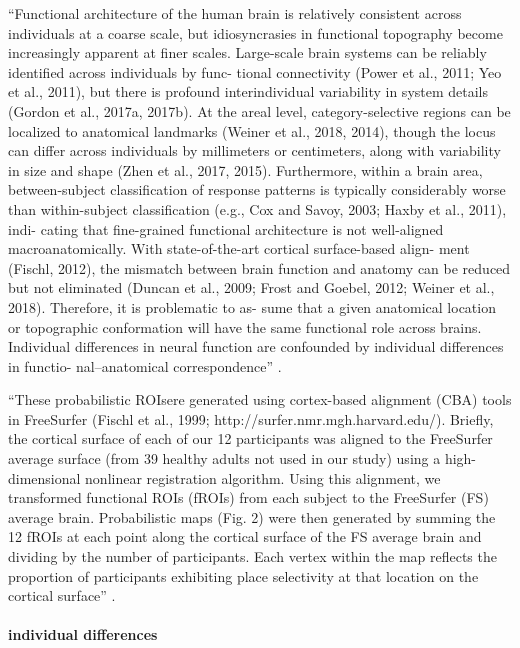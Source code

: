 ``Functional architecture of the human brain is relatively consistent across
individuals at a coarse scale, but idiosyncrasies in functional topography
become increasingly apparent at ﬁner scales. Large-scale brain systems can be
reliably identiﬁed across individuals by func- tional connectivity (Power et
al., 2011; Yeo et al., 2011), but there is profound interindividual variability
in system details (Gordon et al., 2017a, 2017b). At the areal level,
category-selective regions can be localized to anatomical landmarks (Weiner et
al., 2018, 2014), though the locus can differ across individuals by millimeters
or centimeters, along with variability in size and shape (Zhen et al., 2017,
2015). Furthermore, within a brain area, between-subject classiﬁcation of
response patterns is typically considerably worse than within-subject
classiﬁcation (e.g., Cox and Savoy, 2003; Haxby et al., 2011), indi- cating that
ﬁne-grained functional architecture is not well-aligned macroanatomically. With
state-of-the-art cortical surface-based align- ment (Fischl, 2012), the mismatch
between brain function and anatomy can be reduced but not eliminated (Duncan et
al., 2009; Frost and Goebel, 2012; Weiner et al., 2018). Therefore, it is
problematic to as- sume that a given anatomical location or topographic
conformation will have the same functional role across brains. Individual
differences in neural function are confounded by individual differences in
functio- nal–anatomical correspondence'' \citep{feilong2018reliable}.

%
``These probabilistic ROIsere generated using cortex-based alignment (CBA) tools
in FreeSurfer (Fischl et al., 1999; http://surfer.nmr.mgh.harvard.edu/). Brieﬂy,
the cortical surface of each of our 12 participants was aligned to the
FreeSurfer average surface (from 39 healthy adults not used in our study) using
a high-dimensional nonlinear registration algorithm. Using this alignment, we
transformed functional ROIs (fROIs) from each subject to the FreeSurfer (FS)
average brain. Probabilistic maps (Fig. 2) were then generated by summing the 12
fROIs at each point along the cortical surface of the FS average brain and
dividing by the number of participants. Each vertex within the map reﬂects the
proportion of participants exhibiting place selectivity at that location on the
cortical surface'' \citep{weiner2018defining}.


\paragraph{individual differences}

